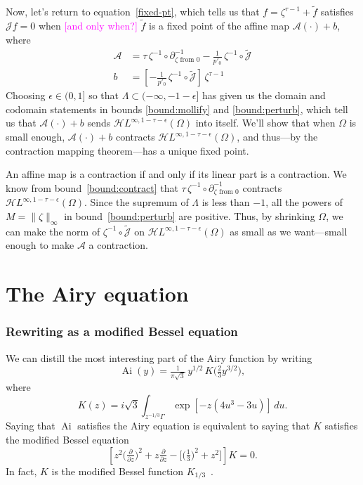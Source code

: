 \documentclass{article}
\theoremstyle{definition}
\newcommand{\holoL}[1]{\mathcal{H}L^{#1}} %
\DeclareMathOperator{\Ai}{Ai}
\begin{document}
Now, let's return to equation~\ref{fixed-pt}, which tells us that $f = \zeta^{\tau-1} + \tilde{f}$ satisfies $\mathcal{J}f = 0$ when \textcolor{magenta}{[and only when?]} $\tilde{f}$ is a fixed point of the affine map $\mathcal{A}(\cdot) + b$, where
\begin{align*}
\mathcal{A} & = \tau\,\zeta^{-1} \circ \partial^{-1}_{\zeta \text{ from } 0} - \tfrac{1}{p'_0}\,\zeta^{-1} \circ \tilde{\mathcal{J}}  \\
b & = \left[ -\tfrac{1}{p'_0}\,\zeta^{-1} \circ \tilde{\mathcal{J}} \right]\,\zeta^{\tau-1}
\end{align*}
Choosing $\epsilon \in (0, 1]$ so that $\Lambda \subset (-\infty, -1 - \epsilon]$ has given us the domain and codomain statements in bounds \ref{bound:mollify} and \ref{bound:perturb}, which tell us that $\mathcal{A}(\cdot) + b$ sends $\holoL{\infty, 1-\tau-\epsilon}(\Omega)$ into itself. We'll show that when $\Omega$ is small enough, $\mathcal{A}(\cdot) + b$ contracts $\holoL{\infty, 1-\tau-\epsilon}(\Omega)$, and thus---by the contraction mapping theorem---has a unique fixed point.

An affine map is a contraction if and only if its linear part is a contraction. We know from bound~\ref{bound:contract} that $\tau\,\zeta^{-1} \circ \partial^{-1}_{\zeta \text{ from } 0}$ contracts $\holoL{\infty, 1-\tau-\epsilon}(\Omega)$. Since the supremum of $\Lambda$ is less than $-1$, all the powers of $M = \|\zeta\|_\infty$ in bound~\ref{bound:perturb} are positive. Thus, by shrinking $\Omega$, we can make the norm of $\zeta^{-1} \circ \tilde{\mathcal{J}}$ on $\holoL{\infty, 1-\tau-\epsilon}(\Omega)$ as small as we want---small enough to make $\mathcal{A}$ a contraction.
%

\section{The Airy equation}\label{airy-appendix}

\subsubsection{Rewriting as a modified Bessel equation}
We can distill the most interesting part of the Airy function by writing
\[ \Ai(y) = \tfrac{1}{\pi\sqrt{3}}\,y^{1/2}\,K\big(\tfrac{2}{3} y^{3/2}\big), \]
where
\begin{equation}\label{integral:mod-bessel}
K(z) = i\sqrt{3} \int_{z^{-1/3}\Gamma} \exp\left[-z \left(4u^3 - 3u\right)\right]\,du.
\end{equation}
Saying that $\Ai$ satisfies the Airy equation is equivalent to saying that $K$ satisfies the modified Bessel equation
\begin{equation}\label{eqn:mod-bessel}
\left[z^2 \big(\tfrac{\partial}{\partial z}\big)^2 + z \tfrac{\partial}{\partial z} - \big[\big(\tfrac{1}{3}\big)^2 + z^2\big]\right] K = 0.
\end{equation}
In fact, $K$ is the modified Bessel function $K_{1/3}$~\cite[equation~9.6.1]{dlmf}.
\end{document}
